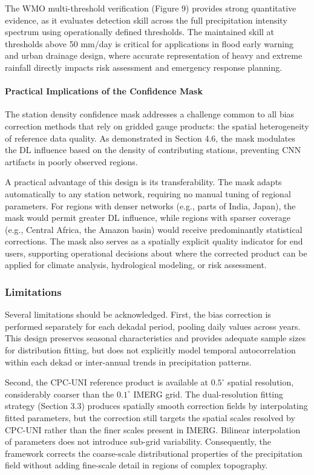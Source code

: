 \documentclass[remotesensing,article,submit,pdftex,moreauthors]{Definitions/mdpi}
\begin{document}
The WMO multi-threshold verification (Figure 9) provides strong
quantitative evidence, as it evaluates detection skill across the full
precipitation intensity spectrum using operationally defined thresholds.
The maintained skill at thresholds above 50 mm/day is critical for
applications in flood early warning and urban drainage design, where
accurate representation of heavy and extreme rainfall directly impacts
risk assessment and emergency response planning.

\paragraph{Practical Implications of the Confidence
Mask}

The station density confidence mask addresses a challenge common to all
bias correction methods that rely on gridded gauge products: the spatial
heterogeneity of reference data quality. As demonstrated in Section 4.6,
the mask modulates the DL influence based on the density of contributing
stations, preventing CNN artifacts in poorly observed regions.

A practical advantage of this design is its transferability. The mask
adapts automatically to any station network, requiring no manual tuning
of regional parameters. For regions with denser networks (e.g., parts of
India, Japan), the mask would permit greater DL influence, while regions
with sparser coverage (e.g., Central Africa, the Amazon basin) would
receive predominantly statistical corrections. The mask also serves as a
spatially explicit quality indicator for end users, supporting
operational decisions about where the corrected product can be applied
for climate analysis, hydrological modeling, or risk assessment.

\subsubsection{Limitations}\label{limitations}

Several limitations should be acknowledged. First, the bias correction
is performed separately for each dekadal period, pooling daily values
across years. This design preserves seasonal characteristics and
provides adequate sample sizes for distribution fitting, but does not
explicitly model temporal autocorrelation within each dekad or
inter-annual trends in precipitation patterns.

Second, the CPC-UNI reference product is available at \(0.5^{\circ}\)
spatial resolution, considerably coarser than the \(0.1^{\circ}\) IMERG
grid. The dual-resolution fitting strategy (Section 3.3) produces
spatially smooth correction fields by interpolating fitted parameters,
but the correction still targets the spatial scales resolved by CPC-UNI
rather than the finer scales present in IMERG. Bilinear interpolation of
parameters does not introduce sub-grid variability. Consequently, the
framework corrects the coarse-scale distributional properties of the
precipitation field without adding fine-scale detail in regions of
complex topography.
\end{document}
